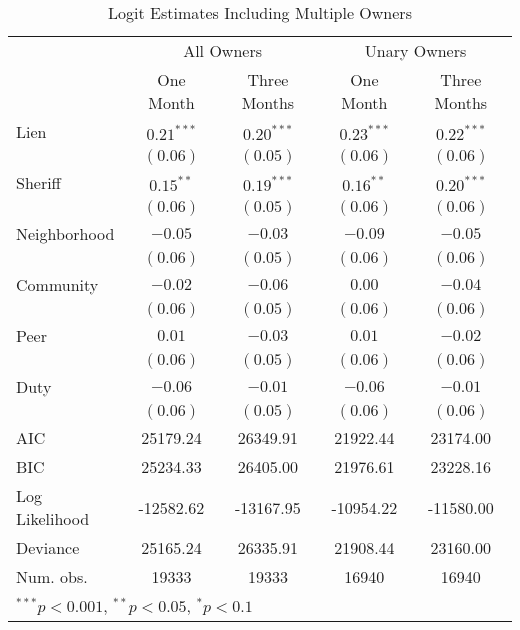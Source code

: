 \documentclass[12pt]{article}
\begin{document}
\begin{appendix}
\begin{table}[htbp]
\caption{Logit Estimates Including Multiple Owners}\label{sh_logit_rob}
\begin{center}
\begin{tabular}{l c c c c }
\hline
 & \multicolumn{2}{c}{All Owners} & \multicolumn{2}{c}{Unary Owners} \\
 & One Month & Three Months & One Month & Three Months \\
\hline
Lien           & $0.21^{***}$ & $0.20^{***}$ & $0.23^{***}$ & $0.22^{***}$ \\
               & $(0.06)$     & $(0.05)$     & $(0.06)$     & $(0.06)$     \\
Sheriff        & $0.15^{**}$  & $0.19^{***}$ & $0.16^{**}$  & $0.20^{***}$ \\
               & $(0.06)$     & $(0.05)$     & $(0.06)$     & $(0.06)$     \\
Neighborhood   & $-0.05$      & $-0.03$      & $-0.09$      & $-0.05$      \\
               & $(0.06)$     & $(0.05)$     & $(0.06)$     & $(0.06)$     \\
Community      & $-0.02$      & $-0.06$      & $0.00$       & $-0.04$      \\
               & $(0.06)$     & $(0.05)$     & $(0.06)$     & $(0.06)$     \\
Peer           & $0.01$       & $-0.03$      & $0.01$       & $-0.02$      \\
               & $(0.06)$     & $(0.05)$     & $(0.06)$     & $(0.06)$     \\
Duty           & $-0.06$      & $-0.01$      & $-0.06$      & $-0.01$      \\
               & $(0.06)$     & $(0.05)$     & $(0.06)$     & $(0.06)$     \\
\hline
AIC            & 25179.24     & 26349.91     & 21922.44     & 23174.00     \\
BIC            & 25234.33     & 26405.00     & 21976.61     & 23228.16     \\
Log Likelihood & -12582.62    & -13167.95    & -10954.22    & -11580.00    \\
Deviance       & 25165.24     & 26335.91     & 21908.44     & 23160.00     \\
Num. obs.      & 19333        & 19333        & 16940        & 16940        \\
\hline
\multicolumn{5}{l}{\scriptsize{$^{***}p<0.001$, $^{**}p<0.05$, $^*p<0.1$}}
\end{tabular}
\end{center}
\end{table}


\end{appendix}
\end{document}

